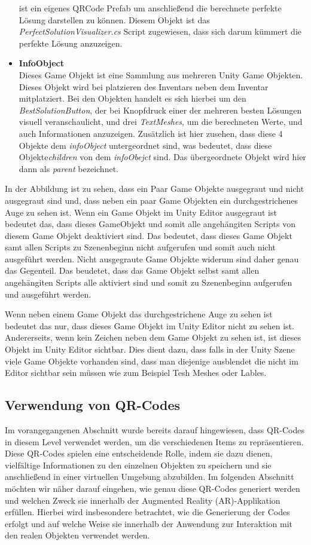 \begin{itemize}
    ist ein eigenes QRCode Prefab um anschließend die berechnete perfekte Lösung darstellen zu können. Diesem Objekt ist
    das \textit{PerfectSolutionVisualizer.cs} Script zugewiesen, dass sich darum kümmert die perfekte Lösung anzuzeigen.
    \item \textbf{InfoObject}\\
    Dieses Game Objekt ist eine Sammlung aus mehreren Unity Game Objekten. Dieses Objekt wird bei platzieren
    des Inventars neben dem Inventar mitplatziert. Bei den Objekten handelt es sich hierbei um den \textit{BestSolutionButton},
    der bei Knopfdruck einer der mehreren besten Lösungen visuell veranschaulicht, und drei \textit{TextMeshes}, um die
    berechneten Werte, und auch Informationen anzuzeigen. Zusätzlich ist hier zusehen, dass diese 4 Objekte dem \textit{infoObject}
    untergeordnet sind, was bedeutet, dass diese Objekte\textit{children} von dem \textit{infoObejct} sind. Das übergeordnete
    Objekt wird hier dann als \textit{parent} bezeichnet.
\end{itemize}

In der Abbildung ist zu sehen, dass ein Paar Game Objekte ausgegraut und nicht ausgegraut sind und, dass neben ein paar Game Objekten ein durchgestrichenes Auge zu sehen ist.
Wenn ein Game Objekt im Unity Editor ausgegraut ist bedeutet das, dass dieses GameObjekt und somit alle angehängiten Scripts von diesem Game Objekt deaktiviert sind.
Das bedeutet, dass dieses Game Objekt samt allen Scripts zu Szenenbeginn nicht aufgerufen und somit auch nicht ausgeführt werden. Nicht ausgegraute Game Objekte widerum sind
daher genau das Gegenteil. Das beudetet, dass das Game Objekt selbst samt allen angehängiten Scripts alle aktiviert sind und somit zu Szenenbeginn aufgerufen und ausgeführt werden.

Wenn neben einem Game Objekt das durchgestrichene Auge zu sehen ist bedeutet das nur, dass dieses Game Objekt im Unity Editor nicht zu sehen ist. Andererseits, wenn kein Zeichen
neben dem Game Objekt zu sehen ist, ist dieses Objekt im Unity Editor sichtbar. Dies dient dazu, dass falls in der Unity Szene viele Game Objekte vorhanden sind, dass man
diejenige ausblendet die nicht im Editor sichtbar sein müssen wie zum Beispiel Tesh Meshes oder Lables.

\subsection{Verwendung von QR-Codes}
Im vorangegangenen Abschnitt wurde bereits darauf hingewiesen, dass QR-Codes in diesem Level verwendet werden,
um die verschiedenen Items zu repräsentieren. Diese QR-Codes spielen eine entscheidende Rolle, indem sie dazu dienen,
vielfältige Informationen zu den einzelnen Objekten zu speichern und sie anschließend in einer virtuellen Umgebung
abzubilden. Im folgenden Abschnitt möchten wir näher darauf eingehen, wie genau diese QR-Codes generiert werden
und welchen Zweck sie innerhalb der Augmented Reality (AR)-Applikation erfüllen. Hierbei wird insbesondere betrachtet,
wie die Generierung der Codes erfolgt und auf welche Weise sie innerhalb der Anwendung zur Interaktion mit den realen Objekten verwendet werden.

